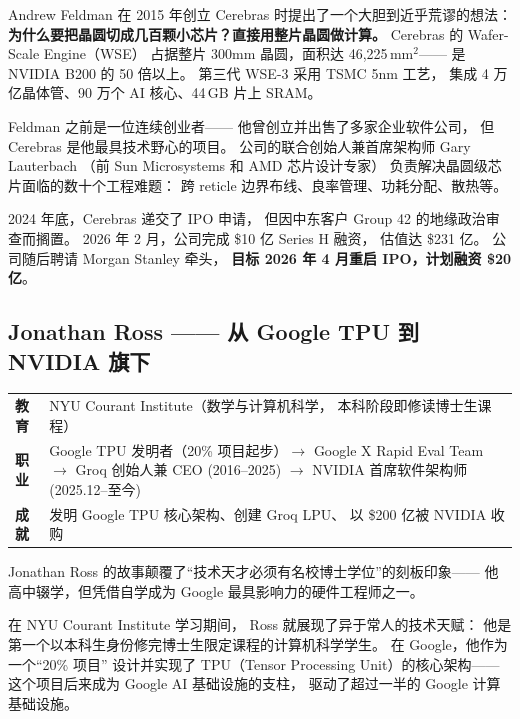 Andrew Feldman 在 2015 年创立 Cerebras 时提出了一个大胆到近乎荒谬的想法：
\textbf{为什么要把晶圆切成几百颗小芯片？直接用整片晶圆做计算。}
Cerebras 的 Wafer-Scale Engine（WSE）
占据整片 300mm 晶圆，面积达 46,225\,mm$^2$——
是 NVIDIA B200 的 50 倍以上。
第三代 WSE-3 采用 TSMC 5nm 工艺，
集成 4 万亿晶体管、90 万个 AI 核心、44\,GB 片上 SRAM。

Feldman 之前是一位连续创业者——
他曾创立并出售了多家企业软件公司，
但 Cerebras 是他最具技术野心的项目。
公司的联合创始人兼首席架构师 Gary Lauterbach
（前 Sun Microsystems 和 AMD 芯片设计专家）
负责解决晶圆级芯片面临的数十个工程难题：
跨 reticle 边界布线、良率管理、功耗分配、散热等。

2024 年底，Cerebras 递交了 IPO 申请，
但因中东客户 Group 42 的地缘政治审查而搁置。
2026 年 2 月，公司完成 \$10 亿 Series H 融资，
估值达 \$231 亿。
公司随后聘请 Morgan Stanley 牵头，
\textbf{目标 2026 年 4 月重启 IPO，计划融资 \$20 亿}。

\subsection{Jonathan Ross —— 从 Google TPU 到 NVIDIA 旗下}
\label{subsec:jonathan-ross}

\begin{keybox}
\small
\begin{tabularx}{\textwidth}{lX}
\toprule
\textbf{教育} & NYU Courant Institute（数学与计算机科学，
                本科阶段即修读博士生课程） \\
\textbf{职业} & Google TPU 发明者（20\% 项目起步）$\to$
                Google X Rapid Eval Team $\to$
                Groq 创始人兼 CEO (2016--2025) $\to$
                NVIDIA 首席软件架构师 (2025.12--至今) \\
\textbf{成就} & 发明 Google TPU 核心架构、创建 Groq LPU、
                以 \$200 亿被 NVIDIA 收购 \\
\bottomrule
\end{tabularx}
\end{keybox}

Jonathan Ross 的故事颠覆了``技术天才必须有名校博士学位''的刻板印象——
他高中辍学，但凭借自学成为 Google 最具影响力的硬件工程师之一。

在 NYU Courant Institute 学习期间，
Ross 就展现了异于常人的技术天赋：
他是第一个以本科生身份修完博士生限定课程的计算机科学学生。
在 Google，他作为一个``20\% 项目''
设计并实现了 TPU（Tensor Processing Unit）的核心架构——
这个项目后来成为 Google AI 基础设施的支柱，
驱动了超过一半的 Google 计算基础设施。

